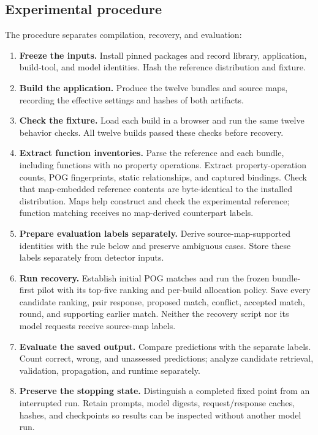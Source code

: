 \subsection{Experimental procedure}
The procedure separates compilation, recovery, and evaluation:
\begin{enumerate}
\item \textbf{Freeze the inputs.} Install pinned packages and record library, application, build-tool, and model identities. Hash the reference distribution and fixture.
\item \textbf{Build the application.} Produce the twelve bundles and source maps, recording the effective settings and hashes of both artifacts.
\item \textbf{Check the fixture.} Load each build in a browser and run the same twelve behavior checks. All twelve builds passed these checks before recovery.
\item \textbf{Extract function inventories.} Parse the reference and each bundle, including functions with no property operations. Extract property-operation counts, POG fingerprints, static relationships, and captured bindings. Check that map-embedded reference contents are byte-identical to the installed distribution. Maps help construct and check the experimental reference; function matching receives no map-derived counterpart labels.
\item \textbf{Prepare evaluation labels separately.} Derive source-map-supported identities with the rule below and preserve ambiguous cases. Store these labels separately from detector inputs.
\item \textbf{Run recovery.} Establish initial POG matches and run the frozen bundle-first pilot with its top-five ranking and per-build allocation policy. Save every candidate ranking, pair response, proposed match, conflict, accepted match, round, and supporting earlier match. Neither the recovery script nor its model requests receive source-map labels.
\item \textbf{Evaluate the saved output.} Compare predictions with the separate labels. Count correct, wrong, and unassessed predictions; analyze candidate retrieval, validation, propagation, and runtime separately.
\item \textbf{Preserve the stopping state.} Distinguish a completed fixed point from an interrupted run. Retain prompts, model digests, request/response caches, hashes, and checkpoints so results can be inspected without another model run.
\end{enumerate}

